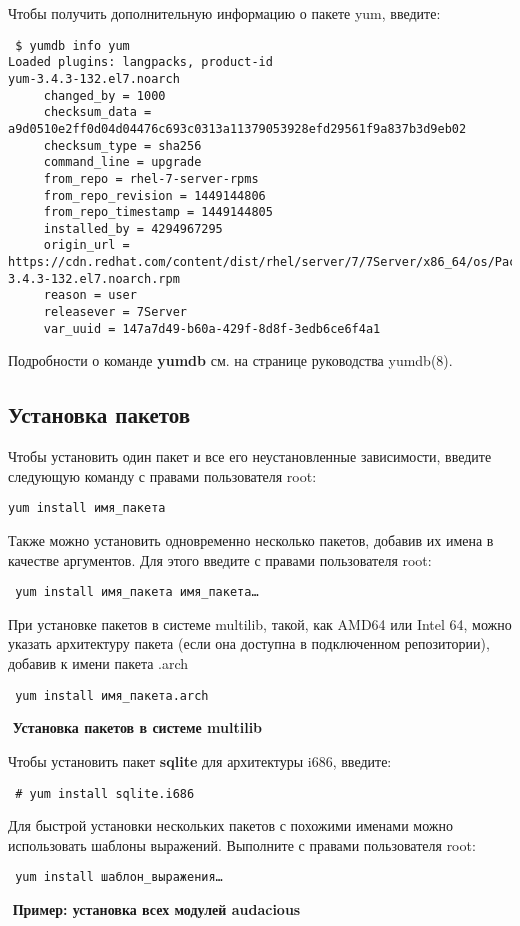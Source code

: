 \documentclass[a4paper,10pt,twoside]{article}
\begin{document}
Чтобы получить дополнительную информацию о пакете yum, введите:
\begin{verbatim}
 $ yumdb info yum
Loaded plugins: langpacks, product-id
yum-3.4.3-132.el7.noarch
     changed_by = 1000
     checksum_data = a9d0510e2ff0d04d04476c693c0313a11379053928efd29561f9a837b3d9eb02
     checksum_type = sha256
     command_line = upgrade
     from_repo = rhel-7-server-rpms
     from_repo_revision = 1449144806
     from_repo_timestamp = 1449144805
     installed_by = 4294967295
     origin_url = https://cdn.redhat.com/content/dist/rhel/server/7/7Server/x86_64/os/Packages/yum-3.4.3-132.el7.noarch.rpm
     reason = user
     releasever = 7Server
     var_uuid = 147a7d49-b60a-429f-8d8f-3edb6ce6f4a1
\end{verbatim} 

Подробности о команде \textbf{yumdb} см. на странице руководства yumdb(8).

\subsection{Установка пакетов}
Чтобы установить один пакет и все его неустановленные зависимости, введите следующую команду с правами пользователя root:
\begin{verbatim}
yum install имя_пакета
\end{verbatim} 
Также можно установить одновременно несколько пакетов, добавив их имена в качестве аргументов. Для этого введите с правами пользователя root: 
\begin{verbatim}
 yum install имя_пакета имя_пакета…
\end{verbatim} 
При установке пакетов в системе multilib, такой, как AMD64 или Intel 64, можно указать архитектуру пакета (если она доступна в подключенном репозитории), добавив к имени пакета .arch
\begin{verbatim}
 yum install имя_пакета.arch
\end{verbatim} 
⁠
\textbf{Установка пакетов в системе multilib}

Чтобы установить пакет \textbf{sqlite} для архитектуры i686, введите:
\begin{verbatim}
 # yum install sqlite.i686
\end{verbatim} 
Для быстрой установки нескольких пакетов с похожими именами можно использовать шаблоны выражений. Выполните с правами пользователя root: 
\begin{verbatim}
 yum install шаблон_выражения…
\end{verbatim} 
⁠
\textbf{Пример: установка всех модулей audacious}
\end{document}
